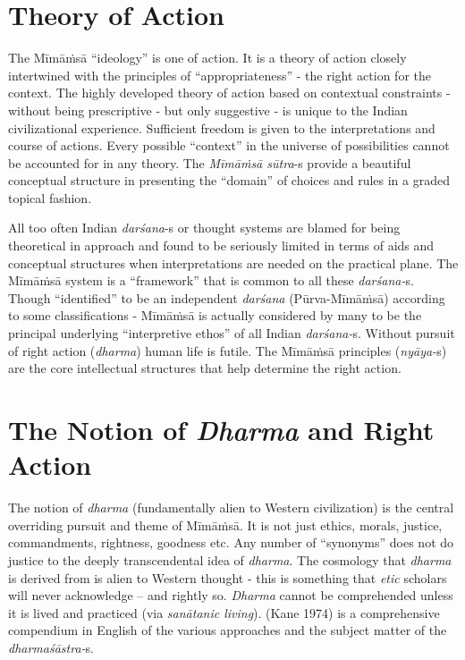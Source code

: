 \section*{Theory of Action}

The Mīmāṁsā “ideology” is one of action. It is a theory of action closely intertwined with the principles of “appropriateness” - the right action for the context. The highly developed theory of action based on contextual constraints - without being prescriptive - but only suggestive - is unique to the Indian civilizational experience. Sufficient freedom is given to the interpretations and course of actions. Every possible “context” in the universe of possibilities cannot be accounted for in any theory. The \textit{Mīmāṁsā sūtra}-s provide a beautiful conceptual structure in presenting the “domain” of choices and rules in a graded topical fashion.

All too often Indian \textit{darśana}-s or thought systems are blamed for being theoretical in approach and found to be seriously limited in terms of aids and conceptual structures when interpretations are needed on the practical plane. The Mīmāṁsā system is a “framework” that is common to all these \textit{darśana-}s. Though “identified” to be an independent \textit{darśana} (Pūrva-Mīmāṁsā) according to some classifications - Mīmāṁsā is actually considered by many to be the principal underlying “interpretive ethos” of all Indian \textit{darśana-}s. Without pursuit of right action (\textit{dharma}) human life is futile. The Mīmāṁsā principles (\textit{nyāya-}s) are the core intellectual structures that help determine the right action.


\section*{The Notion of \textit{Dharma} and Right Action}

The notion of \textit{dharma} (fundamentally alien to Western civilization) is the central overriding pursuit and theme of Mīmāṁsā. It is not just ethics, morals, justice, commandments, rightness, goodness etc. Any number of “synonyms” does not do justice to the deeply transcendental idea of \textit{dharma}. The cosmology that \textit{dharma} is derived from is alien to Western thought - this is something that \textit{etic} scholars will never acknowledge – and rightly so. \textit{Dharma} cannot be comprehended unless it is lived and practiced (via \textit{sanātanic living}). (Kane 1974) is a comprehensive compendium in English of the various approaches and the subject matter of the \textit{dharmaśāstra-}s.

